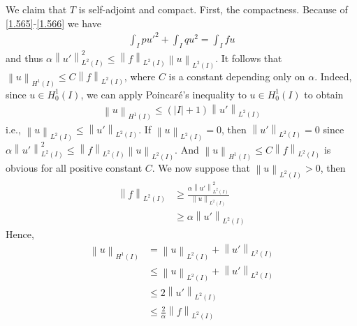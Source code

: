 \documentclass[a4paper,oneside]{article}
\numberwithin{equation}{section}
\begin{document}
We claim that $T$ is self-adjoint and compact. First, the compactness. Because of \eqref{1.565}-\eqref{1.566} we have
\begin{align}
\int_I {pu{'^2}}  + \int_I {q{u^2}}  = \int_I {fu} 
\end{align}
and thus $\alpha \left\| {u'} \right\|_{{L^2}\left( I \right)}^2 \le {\left\| f \right\|_{{L^2}\left( I \right)}}{\left\| u \right\|_{{L^2}\left( I \right)}}$. It follows that ${\left\| u \right\|_{{H^1}\left( I \right)}} \le C{\left\| f \right\|_{{L^2}\left( I \right)}}$, where $C$ is a constant depending only on $\alpha$. Indeed, since $u\in H_0^1\left(I\right)$, we can apply Poincar\'{e}'s inequality to $u\in H_0^1\left(I\right)$ to obtain
\begin{align}
{\left\| u \right\|_{{H^1}\left( I \right)}} \le \left( {\left| I \right| + 1} \right){\left\| {u'} \right\|_{{L^2}\left( I \right)}}
\end{align}
i.e., ${\left\| u \right\|_{{L^2}\left( I \right)}} \le {\left\| {u'} \right\|_{{L^2}\left( I \right)}}$. If ${\left\| u \right\|_{{L^2}\left( I \right)}}=0$, then ${\left\| {u'} \right\|_{{L^2}\left( I \right)}}=0$ since $\alpha \left\| {u'} \right\|_{{L^2}\left( I \right)}^2 \le {\left\| f \right\|_{{L^2}\left( I \right)}}{\left\| u \right\|_{{L^2}\left( I \right)}}$. And ${\left\| u \right\|_{{H^1}\left( I \right)}} \le C{\left\| f \right\|_{{L^2}\left( I \right)}}$ is obvious for all positive constant $C$. We now suppose that ${\left\| u \right\|_{{L^2}\left( I \right)}}>0$, then
\begin{align}
{\left\| f \right\|_{{L^2}\left( I \right)}} &\ge \frac{{\alpha \left\| {u'} \right\|_{{L^2}\left( I \right)}^2}}{{{{\left\| u \right\|}_{{L^2}\left( I \right)}}}}\\
& \ge \alpha {\left\| u' \right\|_{{L^2}\left( I \right)}}
\end{align}
Hence,
\begin{align}
{\left\| u \right\|_{{H^1}\left( I \right)}} &= {\left\| u \right\|_{{L^2}\left( I \right)}} + {\left\| {u'} \right\|_{{L^2}\left( I \right)}}\\
& \le {\left\| u \right\|_{{L^2}\left( I \right)}} + {\left\| {u'} \right\|_{{L^2}\left( I \right)}}\\
& \le 2{\left\| {u'} \right\|_{{L^2}\left( I \right)}}\\
& \le \frac{2}{\alpha }{\left\| f \right\|_{{L^2}\left( I \right)}}
\end{align}
\end{document}
